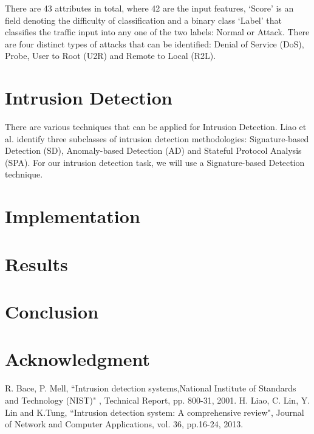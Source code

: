 \documentclass[conference]{IEEEtran}
\begin{document}
There are 43 attributes in total, where 42 are the input features, `Score' is an field denoting the difficulty of classification and a binary class `Label' that classifies the traffic input into any one of the two labels: Normal or Attack. There are four distinct types of attacks that can be identified: Denial of Service (DoS), Probe, User to Root (U2R) and Remote to Local (R2L).

\section{Intrusion Detection}
There are various techniques that can be applied for Intrusion Detection. Liao et al. \cite{b2} identify three subclasses of intrusion detection methodologies: Signature-based Detection (SD), Anomaly-based Detection (AD) and Stateful Protocol Analysis (SPA). For our intrusion detection task, we will use a Signature-based Detection technique.


\section{Implementation}

\section{Results}

\section{Conclusion}

\section*{Acknowledgment}

\begin{thebibliography}{00}
 R. Bace, P. Mell, ``Intrusion detection systems,National Institute of Standards and
Technology (NIST)" , Technical Report, pp. 800-31, 2001.
 H. Liao, C. Lin, Y. Lin and K.Tung, ``Intrusion detection system: A comprehensive review", Journal of Network and Computer Applications, vol. 36, pp.16-24, 2013.
\end{thebibliography}
\end{document}
